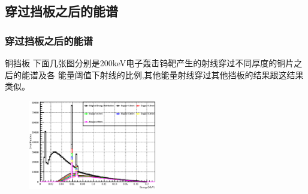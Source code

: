 \documentclass{beamer}
\newcommand{\liuhao}{\fontsize{7.875pt}{\baselineskip}\selectfont}
\begin{document}
\begin{CJK*}{UTF8}{gkai}
  \subsection{穿过挡板之后的能谱}
  \begin{frame}\frametitle{穿过挡板之后的能谱}
    \vskip -0.2cm
    \begin{alertblock}{\liuhao 铜挡板}
      \liuhao 下面几张图分别是200keV电子轰击钨靶产生的射线穿过不同厚度的铜片之后的能谱及各
      能量阈值下射线的比例,其他能量射线穿过其他挡板的结果跟这结果类似。
    \end{alertblock}
    \vskip -0.2cm
    \begin{figure}[ht]
      \includegraphics[width=0.5\textwidth]{200keVEnergyAfterCopperApron.eps}


\end{figure}
\end{frame}
\end{CJK*}
\end{document}
